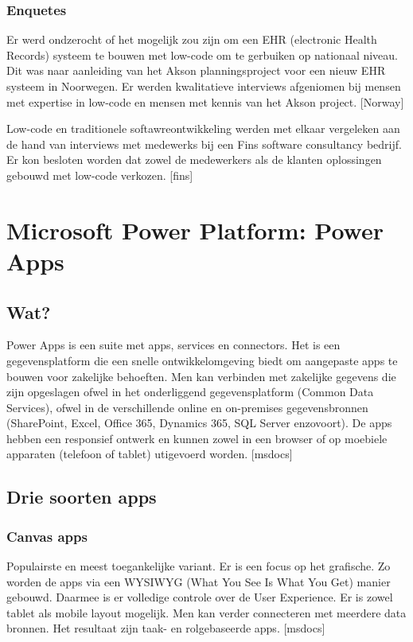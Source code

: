 \subsubsection{Enquetes}

Er werd ondzerocht of het mogelijk zou zijn om een EHR (electronic Health Records) systeem te bouwen met low-code om te gerbuiken op nationaal niveau. Dit was naar aanleiding van het Akson planningsproject voor een nieuw EHR systeem in Noorwegen. Er werden kwalitatieve interviews afgeniomen bij mensen met expertise in low-code en mensen met kennis van het Akson project. [Norway]

Low-code en traditionele softawreontwikkeling werden met elkaar vergeleken aan de hand van interviews met medewerks bij een Fins software consultancy bedrijf. Er kon besloten worden dat zowel de medewerkers als de klanten oplossingen gebouwd met low-code verkozen. [fins]

\section{Microsoft Power Platform: Power Apps}

\subsection{Wat?}


Power Apps is een suite met apps, services en connectors. Het is een gegevensplatform die een snelle ontwikkelomgeving biedt om aangepaste apps te bouwen voor zakelijke behoeften. Men kan verbinden met zakelijke gegevens die zijn opgeslagen ofwel in het onderliggend gegevensplatform (Common Data Services), ofwel in de verschillende online en on-premises gegevensbronnen (SharePoint, Excel, Office 365, Dynamics 365, SQL Server enzovoort). De apps hebben een responsief ontwerk en kunnen zowel in een browser of op moebiele apparaten (telefoon of tablet) utigevoerd worden. [msdocs]

\subsection{Drie soorten apps}

\subsubsection{Canvas apps}

Populairste en meest toegankelijke variant. Er is een focus op het grafische. Zo worden de apps via een WYSIWYG (What You See Is What You Get) manier gebouwd. Daarmee is er volledige controle over de User Experience. Er is zowel tablet als mobile layout mogelijk. Men kan verder connecteren met meerdere data bronnen. Het resultaat zijn taak- en rolgebaseerde apps. [msdocs]

